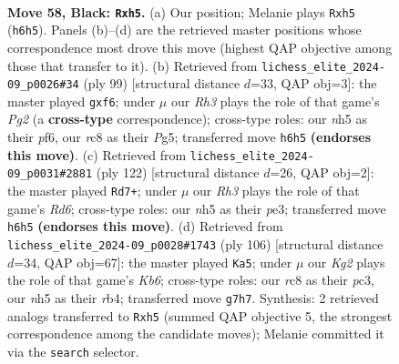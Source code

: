 \documentclass[11pt]{article}
\begin{document}
\clearpage

\begin{figure}[p]\centering
\begin{subfigure}{0.46\textwidth}\centering
\resizebox{\linewidth}{!}{%
\newchessgame
\chessboard[
  setfen={2R5/3r1pk1/7r/p6N/4K3/1P6/R2p3P/8 b - - 3 58},
  showmover=false,
  pgfstyle=straightmove, color=movearrow, markmove={h6-h5}
]}
\caption{}
\end{subfigure}\hfill
\begin{subfigure}{0.46\textwidth}\centering
\resizebox{\linewidth}{!}{%
\newchessgame
\chessboard[
  setfen={8/R5p1/3k1P2/1p4pP/8/6K1/pr6/8 b - - 0 50},
  showmover=false,
  pgfstyle=straightmove, color=movearrow, markmove={g7-f6}
]}
\caption{}
\end{subfigure}
\\[4pt]
\begin{subfigure}{0.46\textwidth}\centering
\resizebox{\linewidth}{!}{%
\newchessgame
\chessboard[
  setfen={8/1k6/3R2r1/1P4P1/P7/1KP1p3/3R4/5r2 w - - 0 62},
  showmover=false,
  pgfstyle=straightmove, color=movearrow, markmove={d6-d7}
]}
\caption{}
\end{subfigure}\hfill
\begin{subfigure}{0.46\textwidth}\centering
\resizebox{\linewidth}{!}{%
\newchessgame
\chessboard[
  setfen={8/P6R/1K6/6p1/1r4P1/2p3kP/8/8 w - - 2 54},
  showmover=false,
  pgfstyle=straightmove, color=movearrow, markmove={b6-a5}
]}
\caption{}
\end{subfigure}
\caption{\textbf{Move 58, Black: \texttt{Rxh5}.} (a) Our position; Melanie plays \texttt{Rxh5} (\texttt{h6h5}). Panels (b)--(d) are the retrieved master positions whose correspondence most drove this move (highest QAP objective among those that transfer to it). (b) Retrieved from \texttt{lichess\_elite\_2024-09\_p0026\#34} (ply 99) [structural distance $d$=33, QAP obj=3]: the master played \texttt{gxf6}; under $\mu$ our \emph{Rh3} plays the role of that game's \emph{Pg2} (a \textbf{cross-type} correspondence); cross-type roles: our \emph{n}h5 as their \emph{p}f6, our \emph{r}c8 as their \emph{P}g5; transferred move \texttt{h6h5} \textbf{(endorses this move)}. (c) Retrieved from \texttt{lichess\_elite\_2024-09\_p0031\#2881} (ply 122) [structural distance $d$=26, QAP obj=2]: the master played \texttt{Rd7+}; under $\mu$ our \emph{Rh3} plays the role of that game's \emph{Rd6}; cross-type roles: our \emph{n}h5 as their \emph{p}e3; transferred move \texttt{h6h5} \textbf{(endorses this move)}. (d) Retrieved from \texttt{lichess\_elite\_2024-09\_p0028\#1743} (ply 106) [structural distance $d$=34, QAP obj=67]: the master played \texttt{Ka5}; under $\mu$ our \emph{Kg2} plays the role of that game's \emph{Kb6}; cross-type roles: our \emph{r}c8 as their \emph{p}c3, our \emph{n}h5 as their \emph{r}b4; transferred move \texttt{g7h7}. Synthesis: 2 retrieved analogs transferred to \texttt{Rxh5} (summed QAP objective 5, the strongest correspondence among the candidate moves); Melanie committed it via the \texttt{search} selector.}
\label{fig:thought-m115}
\end{figure}
\end{document}
